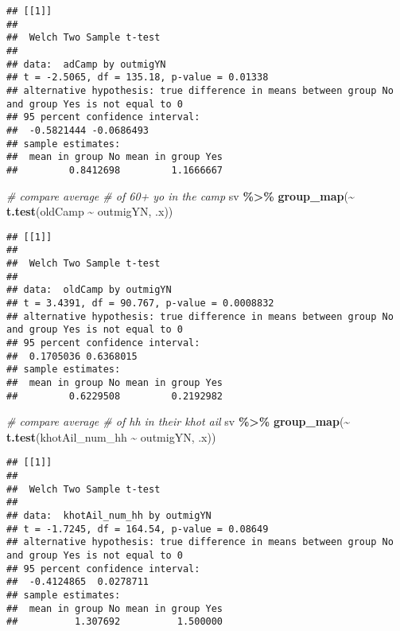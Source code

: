 \documentclass[
]{article}
\newenvironment{Shaded}{\begin{snugshade}}{\end{snugshade}}
\newcommand{\CommentTok}[1]{\textcolor[rgb]{0.56,0.35,0.01}{\textit{#1}}}
\newcommand{\FunctionTok}[1]{\textcolor[rgb]{0.13,0.29,0.53}{\textbf{#1}}}
\newcommand{\NormalTok}[1]{#1}
\newcommand{\SpecialCharTok}[1]{\textcolor[rgb]{0.81,0.36,0.00}{\textbf{#1}}}
\begin{document}
\begin{verbatim}
## [[1]]
## 
##  Welch Two Sample t-test
## 
## data:  adCamp by outmigYN
## t = -2.5065, df = 135.18, p-value = 0.01338
## alternative hypothesis: true difference in means between group No and group Yes is not equal to 0
## 95 percent confidence interval:
##  -0.5821444 -0.0686493
## sample estimates:
##  mean in group No mean in group Yes 
##         0.8412698         1.1666667
\end{verbatim}

\begin{Shaded}
\begin{Highlighting}[]
\CommentTok{\# compare average \# of 60+ yo in the camp}
\NormalTok{sv }\SpecialCharTok{\%\textgreater{}\%} \FunctionTok{group\_map}\NormalTok{(}\SpecialCharTok{\textasciitilde{}} \FunctionTok{t.test}\NormalTok{(oldCamp }\SpecialCharTok{\textasciitilde{}}\NormalTok{ outmigYN, .x))}
\end{Highlighting}
\end{Shaded}

\begin{verbatim}
## [[1]]
## 
##  Welch Two Sample t-test
## 
## data:  oldCamp by outmigYN
## t = 3.4391, df = 90.767, p-value = 0.0008832
## alternative hypothesis: true difference in means between group No and group Yes is not equal to 0
## 95 percent confidence interval:
##  0.1705036 0.6368015
## sample estimates:
##  mean in group No mean in group Yes 
##         0.6229508         0.2192982
\end{verbatim}

\begin{Shaded}
\begin{Highlighting}[]
\CommentTok{\# compare average \# of hh in their khot ail}
\NormalTok{sv }\SpecialCharTok{\%\textgreater{}\%} \FunctionTok{group\_map}\NormalTok{(}\SpecialCharTok{\textasciitilde{}} \FunctionTok{t.test}\NormalTok{(khotAil\_num\_hh }\SpecialCharTok{\textasciitilde{}}\NormalTok{ outmigYN, .x))}
\end{Highlighting}
\end{Shaded}

\begin{verbatim}
## [[1]]
## 
##  Welch Two Sample t-test
## 
## data:  khotAil_num_hh by outmigYN
## t = -1.7245, df = 164.54, p-value = 0.08649
## alternative hypothesis: true difference in means between group No and group Yes is not equal to 0
## 95 percent confidence interval:
##  -0.4124865  0.0278711
## sample estimates:
##  mean in group No mean in group Yes 
##          1.307692          1.500000
\end{verbatim}
\end{document}
